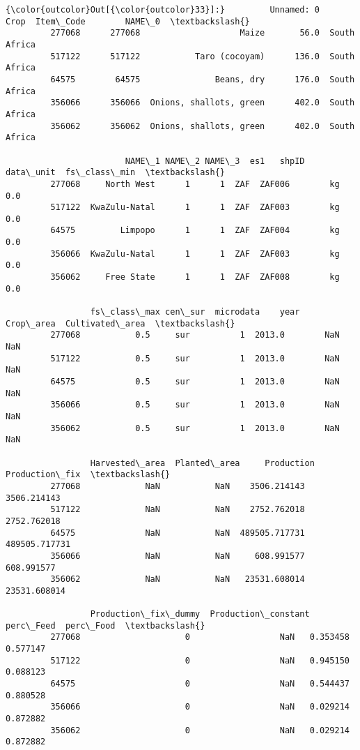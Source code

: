 \documentclass[11pt]{article}
\begin{document}
            \begin{Verbatim}[commandchars=\\\{\}]
{\color{outcolor}Out[{\color{outcolor}33}]:}         Unnamed: 0                     Crop  Item\_Code        NAME\_0  \textbackslash{}
         277068      277068                    Maize       56.0  South Africa   
         517122      517122           Taro (cocoyam)      136.0  South Africa   
         64575        64575               Beans, dry      176.0  South Africa   
         356066      356066  Onions, shallots, green      402.0  South Africa   
         356062      356062  Onions, shallots, green      402.0  South Africa   
         
                        NAME\_1 NAME\_2 NAME\_3  es1   shpID data\_unit  fs\_class\_min  \textbackslash{}
         277068     North West      1      1  ZAF  ZAF006        kg           0.0   
         517122  KwaZulu-Natal      1      1  ZAF  ZAF003        kg           0.0   
         64575         Limpopo      1      1  ZAF  ZAF004        kg           0.0   
         356066  KwaZulu-Natal      1      1  ZAF  ZAF003        kg           0.0   
         356062     Free State      1      1  ZAF  ZAF008        kg           0.0   
         
                 fs\_class\_max cen\_sur  microdata    year  Crop\_area  Cultivated\_area  \textbackslash{}
         277068           0.5     sur          1  2013.0        NaN              NaN   
         517122           0.5     sur          1  2013.0        NaN              NaN   
         64575            0.5     sur          1  2013.0        NaN              NaN   
         356066           0.5     sur          1  2013.0        NaN              NaN   
         356062           0.5     sur          1  2013.0        NaN              NaN   
         
                 Harvested\_area  Planted\_area     Production  Production\_fix  \textbackslash{}
         277068             NaN           NaN    3506.214143     3506.214143   
         517122             NaN           NaN    2752.762018     2752.762018   
         64575              NaN           NaN  489505.717731   489505.717731   
         356066             NaN           NaN     608.991577      608.991577   
         356062             NaN           NaN   23531.608014    23531.608014   
         
                 Production\_fix\_dummy  Production\_constant  perc\_Feed  perc\_Food  \textbackslash{}
         277068                     0                  NaN   0.353458   0.577147   
         517122                     0                  NaN   0.945150   0.088123   
         64575                      0                  NaN   0.544437   0.880528   
         356066                     0                  NaN   0.029214   0.872882   
         356062                     0                  NaN   0.029214   0.872882   
         

\end{Verbatim}
\end{document}
